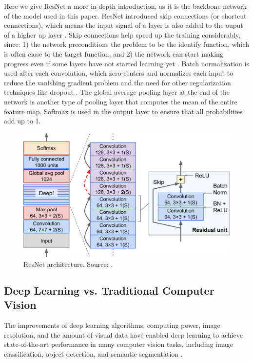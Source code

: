 \documentclass[a4paper, 11pt, oneside]{article}
\begin{document}
  Here we give ResNet a more in-depth introduction, as it is the backbone network of the model used in this paper.
  ResNet introduced skip connections (or shortcut connections), which means the input signal of a layer is also added to the
  ouput of a higher up layer \cite{geron2019hands, he2016deep}. Skip connections help speed up the training considerably,
  since: 1) the network preconditions the problem to be the identify function, which is often close to the target function,
  and 2) the network can start making progress even if some layers have not started learning yet
  \cite{geron2019hands, he2016deep}. Batch normalization \cite{ioffe2015batch} is used after each convolution, which
  zero-centers and normalizes each input to reduce the vanishing gradient problem \cite{hochreiter1998vanishing} and the
  need for other regularization techniques like dropout \cite{srivastava2014dropout}. The global average pooling layer
  at the end of the network is another type of pooling layer that computes the mean of the entire feature map. Softmax
  is used in the output layer to ensure that all probabilities add up to 1.

  \begin{figure}[ht]
    \begin{center}
      \includegraphics[width=.8\textwidth]{resnet.png}
    \end{center}
    \caption{ResNet architecture. Source: \cite{geron2019hands}.}
  \end{figure}

  \subsection{Deep Learning vs. Traditional Computer Vision}

  \label{sec:dlvscv}

  The improvements of deep learning algorithms, computing power, image resolution, and the amount of visual data have
  enabled deep learning to achieve state-of-the-art performance in many computer vision tasks, including image
  classification, object detection, and semantic segmentation \cite{qin2015underwater, voulodimos2018deep, o2019deep}.
\end{document}
